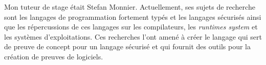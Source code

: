         Mon tuteur de stage était Stefan Monnier. Actuellement, ses sujets de recherche sont les langages de programmation fortement typés et les
        langages sécurisés ainsi que les répercussions de ces langages sur les compilateurs, les \textit{runtimes system} et les systèmes d'exploitations.
        Ces recherches l'ont amené à créer le langage \typer{} qui sert de preuve de concept pour un langage sécurisé et qui fournit des outils
        pour la création de preuves de logiciels.
